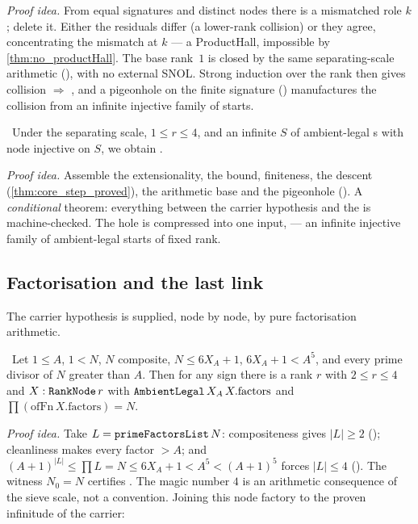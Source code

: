 \emph{Proof idea.} From equal signatures and distinct nodes there is a mismatched role $k$; delete it.
Either the residuals differ (a lower-rank collision) or they agree, concentrating the mismatch at $k$
--- a ProductHall, impossible by \cref{thm:no_productHall}. The base rank~$1$ is closed by the
same separating-scale arithmetic (), with no external SNOL.
Strong induction over the rank then gives collision $\Rightarrow$ , and a pigeonhole on
the finite signature () manufactures the collision from an infinite
injective family of starts.

\begin{theorem}\label{thm:product_core_engine_of_carrier}
\green{}\ Under the separating scale, $1\le r\le4$, and an infinite $S$ of ambient-legal
s with $\mathrm{node}$ injective on $S$, we obtain .
\end{theorem}

\emph{Proof idea.} Assemble the extensionality, the bound, finiteness, the descent
(\cref{thm:core_step_proved}), the arithmetic base and the pigeonhole
(). A \emph{conditional} theorem: everything between the
carrier hypothesis and the  is machine-checked. The hole is compressed into one input,
 --- an infinite injective family of ambient-legal starts of fixed rank.

\subsection{Factorisation and the last link}

The carrier hypothesis is supplied, node by node, by pure factorisation arithmetic.

\begin{theorem}\label{thm:mkNode_of_composite}
\green{}\ Let $1\le A$, $1<N$, $N$ composite, $N\le 6X_A+1$, $6X_A+1<A^5$, and every prime divisor of
$N$ greater than $A$. Then for any sign there is a rank $r$ with $2\le r\le4$ and $X:\texttt{RankNode}\,r$
with $\texttt{AmbientLegal}\,X_A\,X.\mathrm{factors}$ and $\prod(\mathrm{ofFn}\,X.\mathrm{factors})=N$.
\end{theorem}

\emph{Proof idea.} Take $L=\texttt{primeFactorsList}\,N$: compositeness gives $|L|\ge2$
(); cleanliness makes every factor $>A$; and $(A+1)^{|L|}\le\prod L=N\le
6X_A+1<A^5<(A+1)^5$ forces $|L|\le4$ (). The witness $N_0=N$ certifies
. The magic number $4$ is an arithmetic consequence of the sieve scale, not
a convention. Joining this node factory to the proven infinitude of the carrier:

